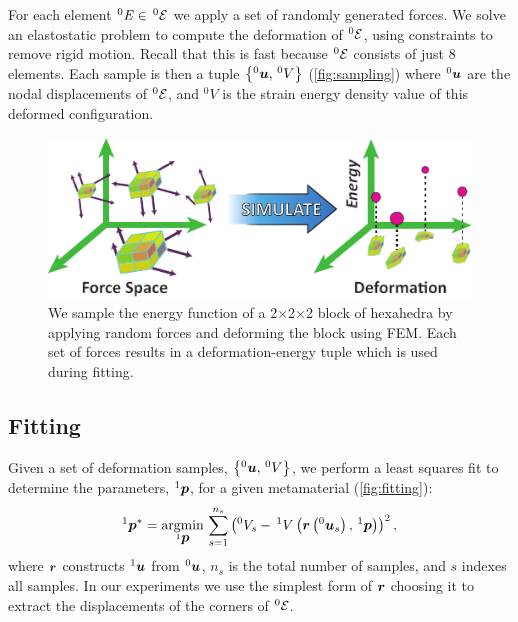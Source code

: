 For each element $^0\mathit{E}\in \, ^0\mathcal{E}$ we apply a set of randomly generated forces.
We solve an elastostatic problem to compute the deformation of $^0\mathcal{E}$, using constraints to remove rigid motion. Recall that this is fast because $^0\mathcal{E}$ consists of just 8 elements.
Each sample is then a tuple $\left\{^0\mbox{$\bm{u}$}, \, ^0V\right\}$ (\autoref{fig:sampling}) where $^0\mbox{$\bm{u}$}$ are the nodal displacements of $^0\mathcal{E}$, and $^0V$ is the strain energy density value of this deformed configuration.
\begin{figure}
	\centering
	\includegraphics[width=0.8\columnwidth]{images/sampling.pdf}
	\caption{ We sample the energy function of a 2$\times$2$\times$2 block of hexahedra by applying random forces and deforming the block using FEM. Each set of forces results in a deformation-energy tuple which is used during fitting.}
	\label{fig:sampling}
\end{figure}

\subsection{Fitting}
\label{sec:fitting}
Given a set of deformation samples, $\left\{ ^0\mbox{$\bm{u}$}, \, ^0V\right\}$, we perform a least squares fit to determine the parameters, $^1\mbox{$\bm{p}$}$, for a given metamaterial (\autoref{fig:fitting}):
\begin{align}
^{1}\mbox{$\bm{p}$}^*= \underset{^1\mbox{$\bm{p}$}}{\operatorname{argmin}} \, \sum_{s=1}^{n_s}\left(^0V_s- \, ^1V\left(\mbox{$\bm{r}$}\left(^0\mbox{$\bm{u}$}_s\right), \, ^1\mbox{$\bm{p}$}\right)\right)^2,
\label{eq:fitting}
\end{align}
where $\mbox{$\bm{r}$}$ constructs $^1\mbox{$\bm{u}$}$ from $^0\mbox{$\bm{u}$}$, $n_s$ is the total number of samples, and $s$ indexes all samples. In our experiments we use the simplest form of $\mbox{$\bm{r}$}$ choosing it to extract the displacements of the corners of $^0\mathcal{E}$.

